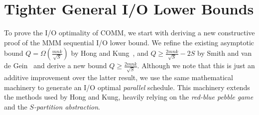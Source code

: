 \documentclass[sigplan,review,anonymous]{acmart}\settopmatter{printfolios=true,printccs=false,printacmref=false}
\newcommand\greg[1]{\textcolor{blue}{[Greg: #1]}}
\newcommand\mac[1]{\textcolor{red}{[Mac: #1]}}
\begin{document}
%

%




\appendix


\section{Tighter General I/O Lower Bounds}
\label{sec:background}

To prove the I/O optimality of COMM, we start with deriving a new constructive 
proof 
of
the MMM sequential I/O lower bound. We refine the existing asymptotic bound $Q 
= \Omega(\frac{mnk}{\sqrt{S}})$ by Hong and
Kung~\cite{redblue}, and $Q \ge \frac{2mnk}{\sqrt{S}} - 2S$ by Smith and van de 
Gein~\cite{tightMMM} and derive a new bound $Q \ge \frac{2mnk}{\sqrt{S}}$. 
Although we note that this is just an additive improvement over the latter 
result, we use the same mathematical machinery to generate an I/O optimal 
\emph{parallel} schedule. This machinery extends the methods used by Hong and
Kung,  heavily relying on the \emph{red-blue
	pebble game} and the \emph{$S$-partition abstraction}. 
%
%
%
%
%
\end{document}
